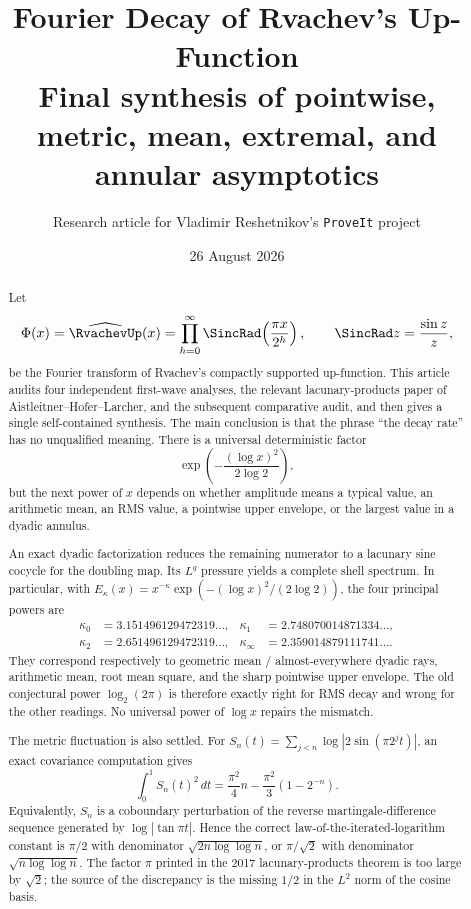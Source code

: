 \documentclass[11pt,oneside]{article}
\title{\bfseries Fourier Decay of Rvachev's Up-Function\\[0.35em]
\large Final synthesis of pointwise, metric, mean, extremal, and annular asymptotics}
\author{Research article for Vladimir Reshetnikov's \texttt{ProveIt} project}
\date{26 August 2026}
\theoremstyle{definition}
\theoremstyle{remark}
\begin{document}
\maketitle

\begin{abstract}
Let
\[
 \Phi(x)=\widehat{\RvachevUp}(x)
 =\prod_{h=0}^{\infty}\SincRad\!\left(\frac{\pi x}{2^h}\right),
 \qquad \SincRad z=\frac{\sin z}{z},
\]
be the Fourier transform of Rvachev's compactly supported up-function.  This article audits
four independent first-wave analyses, the relevant lacunary-products paper of
Aistleitner--Hofer--Larcher, and the subsequent comparative audit, and then gives a single
self-contained synthesis.  The main conclusion is that the phrase ``the decay rate'' has no
unqualified meaning.  There is a universal deterministic factor
\[
 \exp\!\left(-\frac{(\log x)^2}{2\log2}\right),
\]
but the next power of $x$ depends on whether amplitude means a typical value, an arithmetic
mean, an RMS value, a pointwise upper envelope, or the largest value in a dyadic annulus.

An exact dyadic factorization reduces the remaining numerator to a lacunary sine cocycle for
the doubling map.  Its $L^q$ pressure yields a complete shell spectrum.  In particular, with
$E_\kappa(x)=x^{-\kappa}\exp(- (\log x)^2/(2\log2))$, the four principal powers are
\[
 \begin{aligned}
 \kappa_0&=3.151496129472319\ldots,&
 \kappa_1&=2.748070014871334\ldots,\\
 \kappa_2&=2.651496129472319\ldots,&
 \kappa_\infty&=2.359014879111741\ldots .
 \end{aligned}
\]
They correspond respectively to geometric mean / almost-everywhere dyadic rays, arithmetic
mean, root mean square, and the sharp pointwise upper envelope.  The old conjectural power
$\log_2(2\pi)$ is therefore exactly right for RMS decay and wrong for the other readings.
No universal power of $\log x$ repairs the mismatch.

The metric fluctuation is also settled.  For
$S_n(t)=\sum_{j<n}\log|2\sin(\pi2^jt)|$, an exact covariance computation gives
\[
 \int_0^1S_n(t)^2\,dt
 =\frac{\pi^2}{4}n-\frac{\pi^2}{3}(1-2^{-n}).
\]
Equivalently, $S_n$ is a coboundary perturbation of the reverse martingale-difference
sequence generated by $\log|\tan\pi t|$.  Hence the correct law-of-the-iterated-logarithm
constant is $\pi/2$ with denominator $\sqrt{2n\log\log n}$, or $\pi/\sqrt2$ with denominator
$\sqrt{n\log\log n}$.  The factor $\pi$ printed in the 2017 lacunary-products theorem is too
large by $\sqrt2$; the source of the discrepancy is the missing $1/2$ in the $L^2$ norm of
the cosine basis.


\end{abstract}
\end{document}
